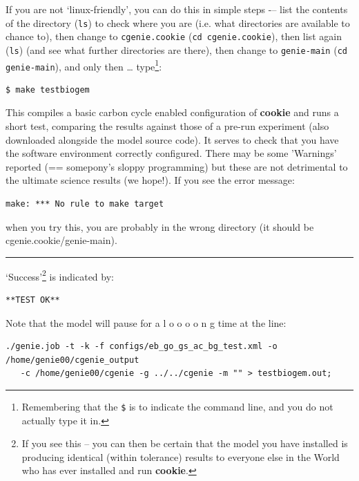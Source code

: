 \noindent If you are not ‘linux-friendly’, you can do this in simple steps -– list the contents of the directory (\texttt{ls}) to check where you are (i.e. what directories are available to chance to), then change to \texttt{cgenie.cookie} (\texttt{cd cgenie.cookie}), then list again (\texttt{ls}) (and see what further directories are there), then change to \texttt{genie-main} (\texttt{cd genie-main}), and only then … type\footnote{Remembering that the \texttt{\$} is to indicate the command line, and you do not actually type it in.}:
\vspace{-2mm}\begin{verbatim}
$ make testbiogem
\end{verbatim}\vspace{-2mm}

\noindent This compiles a basic carbon cycle enabled configuration of \textbf{cookie} and runs a short test, comparing the results against those of a pre-run experiment (also downloaded alongside the model source code). It serves to check that you have the software environment correctly configured. There may be some ’Warnings’ reported (== somepony’s sloppy programming) but these are not detrimental to the ultimate science results (we hope!).
\vspace{1mm}
If you see the error message:
\vspace{-2mm}\begin{verbatim}
make: *** No rule to make target 
\end{verbatim}\vspace{-2mm}
when you try this, you are probably in the wrong directory (it should be \textsf{\footnotesize cgenie.cookie/genie-main}).

\vspace{1mm}\noindent\rule{4cm}{0.5pt}\vspace{2mm}

\noindent ‘Success’\footnote{If you see this -- you can then be certain that the model you have installed is producing identical (within tolerance) results to everyone else in the World who has ever installed and run \textbf{cookie}.} is indicated by:
\vspace{-1mm}\small\begin{verbatim}
**TEST OK**
\end{verbatim}\normalsize\vspace{-1mm}

Note that the model will pause for a l o o o o n g time at the line:
\vspace{-2mm}
\small\begin{verbatim}
./genie.job -t -k -f configs/eb_go_gs_ac_bg_test.xml -o /home/genie00/cgenie_output
   -c /home/genie00/cgenie -g ../../cgenie -m "" > testbiogem.out;
\end{verbatim}\normalsize
\vspace{-2mm}


